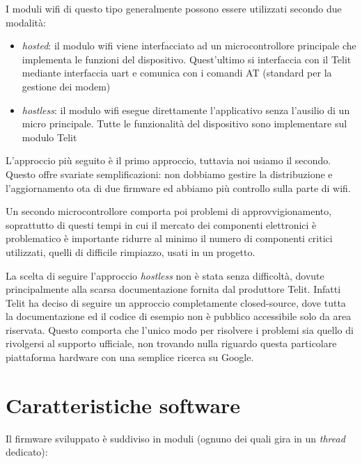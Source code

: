 \documentclass[12pt,a4paper,twoside,titlepage]{book}
\begin{document}
I moduli \Gls{wifi} di questo tipo generalmente possono essere utilizzati secondo due modalità:
\begin{itemize}
    \item \textit{hosted}: il modulo \Gls{wifi} viene interfacciato ad un microcontrollore
        principale che implementa le funzioni del dispositivo. Quest'ultimo si interfaccia
        con il Telit mediante interfaccia \acrshort{uart} e comunica con i comandi AT (standard
        per la gestione dei modem)
    \item \textit{hostless}: il modulo \Gls{wifi} esegue direttamente l'applicativo senza
        l'ausilio di un \gls{micro} principale. Tutte le funzionalità del dispositivo
        sono implementare sul modulo Telit
\end{itemize}

L'approccio più seguito è il primo approccio, tuttavia noi usiamo il secondo.
Questo offre svariate semplificazioni: non dobbiamo gestire la distribuzione
e l'aggiornamento \acrshort{ota} di due \gls{firmware} ed abbiamo più controllo sulla 
parte di \Gls{wifi}.

Un secondo microcontrollore comporta poi problemi di approvvigionamento, soprattutto di
questi tempi in cui il mercato dei componenti elettronici è problematico è importante ridurre 
al minimo il numero di componenti critici utilizzati, quelli di difficile rimpiazzo, usati in un progetto.

La scelta di seguire l'approccio \textit{hostless} non è stata senza difficoltà, dovute
principalmente alla scarsa documentazione fornita dal produttore Telit. Infatti 
Telit ha deciso di seguire un approccio completamente closed-source, dove tutta
la documentazione ed il codice di esempio non è pubblico accessibile solo da area riservata.
Questo comporta che l'unico modo per risolvere i problemi sia quello di rivolgersi
al supporto ufficiale, non trovando nulla riguardo questa particolare piattaforma
hardware con una semplice ricerca su Google.

\section{Caratteristiche software}

Il \gls{firmware} sviluppato è suddiviso in moduli (ognuno dei quali gira in un \textit{thread} dedicato):
\end{document}
